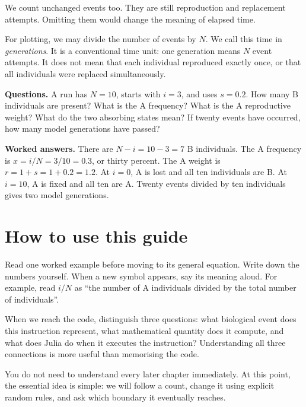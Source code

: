 We count unchanged events too. They are still reproduction and replacement
attempts. Omitting them would change the meaning of elapsed time.

For plotting, we may divide the number of events by \(N\). We call this time
in \emph{generations}. It is a conventional time unit: one generation means
\(N\) event attempts. It does not mean that each individual reproduced
exactly once, or that all individuals were replaced simultaneously.

\begin{checkpoint}
\textbf{Questions.} A run has \(N=10\), starts with \(i=3\), and uses
\(s=0.2\). How many B individuals are present? What is the A frequency? What
is the A reproductive weight? What do the two absorbing states mean? If
twenty events have occurred, how many model generations have passed?

\textbf{Worked answers.} There are \(N-i=10-3=7\) B individuals. The A
frequency is \(x=i/N=3/10=0.3\), or thirty percent. The A weight is
\(r=1+s=1+0.2=1.2\). At \(i=0\), A is lost and all ten individuals are B.
At \(i=10\), A is fixed and all ten are A. Twenty events divided by ten
individuals gives two model generations.
\end{checkpoint}

\section{How to use this guide}

Read one worked example before moving to its general equation. Write down
the numbers yourself. When a new symbol appears, say its meaning aloud.
For example, read \(i/N\) as ``the number of A individuals divided by the
total number of individuals''.

When we reach the code, distinguish three questions: what biological event
does this instruction represent, what mathematical quantity does it compute,
and what does Julia do when it executes the instruction? Understanding all
three connections is more useful than memorising the code.

You do not need to understand every later chapter immediately. At this point,
the essential idea is simple: we will follow a count, change it using explicit
random rules, and ask which boundary it eventually reaches.
